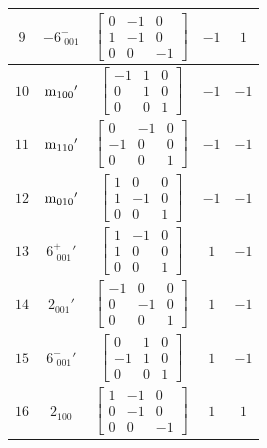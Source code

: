 \documentclass[fleqn,8pt]{jsarticle}
\begin{document}
\begin{longtable}{ccccc}
$ 9 $ & $ -6^{-}_{\,\,001} $ & $ \begin{bmatrix} 0 & -1 & 0 \\ 1 & -1 & 0 \\ 0 & 0 & -1 \end{bmatrix} $ & $ -1 $ & $ 1 $ \\ \hline
$ 10 $ & $ {\rm m}_{100}{}' $ & $ \begin{bmatrix} -1 & 1 & 0 \\ 0 & 1 & 0 \\ 0 & 0 & 1 \end{bmatrix} $ & $ -1 $ & $ -1 $ \\ \hline
$ 11 $ & $ {\rm m}_{110}{}' $ & $ \begin{bmatrix} 0 & -1 & 0 \\ -1 & 0 & 0 \\ 0 & 0 & 1 \end{bmatrix} $ & $ -1 $ & $ -1 $ \\ \hline
$ 12 $ & $ {\rm m}_{010}{}' $ & $ \begin{bmatrix} 1 & 0 & 0 \\ 1 & -1 & 0 \\ 0 & 0 & 1 \end{bmatrix} $ & $ -1 $ & $ -1 $ \\ \hline
$ 13 $ & $ 6^{+}_{\,\,001}{}' $ & $ \begin{bmatrix} 1 & -1 & 0 \\ 1 & 0 & 0 \\ 0 & 0 & 1 \end{bmatrix} $ & $ 1 $ & $ -1 $ \\ \hline
$ 14 $ & $ 2{}_{001}{}' $ & $ \begin{bmatrix} -1 & 0 & 0 \\ 0 & -1 & 0 \\ 0 & 0 & 1 \end{bmatrix} $ & $ 1 $ & $ -1 $ \\ \hline
$ 15 $ & $ 6^{-}_{\,\,001}{}' $ & $ \begin{bmatrix} 0 & 1 & 0 \\ -1 & 1 & 0 \\ 0 & 0 & 1 \end{bmatrix} $ & $ 1 $ & $ -1 $ \\ \hline
$ 16 $ & $ 2{}_{100} $ & $ \begin{bmatrix} 1 & -1 & 0 \\ 0 & -1 & 0 \\ 0 & 0 & -1 \end{bmatrix} $ & $ 1 $ & $ 1 $ \\ \hline

\end{longtable}
\end{document}
